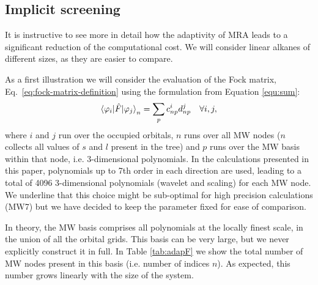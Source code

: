 \documentclass[journal=jctcce, manuscript=article]{achemso}
\begin{document}
\subsection{Implicit screening} 
\label{sec:screen}

It is instructive to see more in detail how the adaptivity of \ac{MRA} leads to a significant reduction of the computational cost. We will consider linear alkanes of different sizes, as they are easier to compare.

As a first illustration we will consider the evaluation  of the Fock matrix, Eq.~\eqref{eq:fock-matrix-definition} using the formulation from Equation \eqref{equ:sum}:
\begin{equation}
\label{equ:sums}
 \braket{\varphi_i | {\hat F} |\varphi_j}_n = \sum_{p} c^i_{np} d^j_{np} \quad\forall i,j, 
\end{equation}
where $i$ and $j$ run over the occupied orbitals, $n$ runs over all \ac{MW} nodes ($n$ collects all values of $s$ and $l$ present in the tree) and
$p$ runs over the \ac{MW} basis within that node, i.e. 3-dimensional polynomials. In the calculations presented in this paper, polynomials up to 7th order in each direction are used, leading to a total of 4096 3-dimensional polynomials (wavelet and scaling) for each \ac{MW} node. We underline that this choice might be sub-optimal for high precision calculations (MW7) but we have decided to keep the parameter fixed for ease of comparison.

In theory, the \ac{MW} basis comprises all polynomials at the locally finest scale, in the union of all the orbital grids. This basis can be very large, but we never explicitly construct it in full. In Table \ref{tab:adapF} we show the total number of \ac{MW} nodes present in this basis (i.e. number of indices $n$). As expected, this number grows linearly with the size of the system.
 
\end{document}
